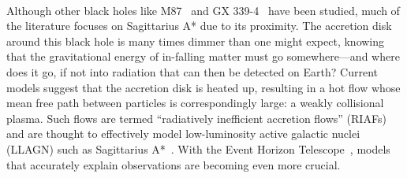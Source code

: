 \\
Although other black holes like M87~\cite{Ressler2015,Oezel2001,Foucart2015,Broderick2015} and GX 339-4~\cite{Plant2014} have been studied, much of the literature focuses on Sagittarius A* due to its proximity. The accretion disk around this black hole is many times dimmer than one might expect, knowing that the gravitational energy of in-falling matter must go somewhere---and where does it go, if not into radiation that can then be detected on Earth? Current models suggest that the accretion disk is heated up, resulting in a hot flow whose mean free path between particles is correspondingly large: a weakly collisional plasma. Such flows are termed ``radiatively inefficient accretion flows'' (RIAFs) and are thought to effectively model low-luminosity active galactic nuclei (LLAGN) such as Sagittarius A*~\cite{Narayan1998,Broderick2011,Broderick2009,Dexter2013,Yuan2003}. With the Event Horizon Telescope~\cite{Doeleman2009}, models that accurately explain observations are becoming even more crucial.

